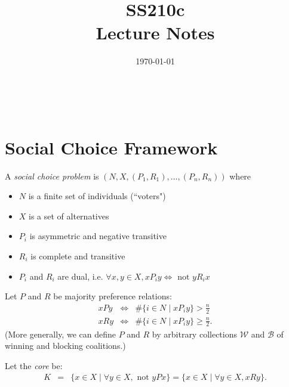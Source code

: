 \documentclass[12pt]{article}
\newcommand{\n}{\noindent}
\newcommand{\s}{\vspace{5mm}}
\begin{document}
\pagestyle{plain}

\title{SS210c \\
Lecture Notes}

\date{\today}
\maketitle

\thispagestyle{empty}
\tableofcontents

\thispagestyle{empty}
\mbox{ }

\newpage




\setcounter{page}{1}

\section{Social Choice Framework}

\n A \textit{social choice problem} is $(N,X,(P_1,R_1),\hdots,(P_n,R_n))$ where
\begin{itemize}
\item $N$ is a finite set of individuals (``voters")
\item $X$ is a set of alternatives
\item $P_i$ is asymmetric and negative transitive
\item $R_i$ is complete and transitive
\item $P_i$ and $R_i$ are dual, i.e. $\forall x,y\in X, xP_iy \Longleftrightarrow \mbox{ not }yR_ix$
\end{itemize}

\s

\n Let $P$ and $R$ be majority preference relations: 
\begin{eqnarray*}
xPy&\Longleftrightarrow&\#\{i\in N\mid xP_iy\}>\frac{n}{2}\\
xRy&\Longleftrightarrow&\#\{i\in N\mid xP_iy\}\geq\frac{n}{2}.
\end{eqnarray*}(More generally, we can define $P$ and $R$ by arbitrary collections $\mathcal{W}$ and $\mathcal{B}$ of winning and blocking coalitions.)

\s

\n Let the \textit{core} be:
\begin{eqnarray*}
K&=&\{x\in X\mid \forall y\in X, \mbox{ not }yPx\}=\{x\in X\mid\forall y\in X, xRy\}.
\end{eqnarray*}
\end{document}
